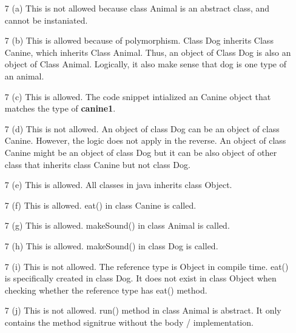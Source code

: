 \documentclass{article}
\begin{document}
\begin{enumerate}
\item[7 (a)] This is not allowed because class Animal is an abstract class, and cannot be instaniated.
\item[7 (b)] This is allowed because of polymorphism. Class Dog inherits Class Canine, which inherits Class Animal. Thus, an object of Class Dog is also an object of Class Animal. Logically, it also make sense that dog is one type of an animal.
\item[7 (c)] This is allowed. The code snippet intialized an Canine object that matches the type of \textbf{canine1}.
\item[7 (d)] This is not allowed. An object of class Dog can be an object of class Canine. However, the logic does not apply in the reverse. An object of class Canine might be an object of class Dog but it can be also object of other class that inherits class Canine but not class Dog.
\item[7 (e)] This is allowed. All classes in java inherits class Object.
\item[7 (f)] This is allowed. eat() in class Canine is called.
\item[7 (g)] This is allowed. makeSound() in class Animal is called.
\item[7 (h)] This is allowed. makeSound() in class Dog is called.
\item[7 (i)] This is not allowed. The reference type is Object in compile time. eat() is specifically created in class Dog. It does not exist in class Object when checking whether the reference type has eat() method.
\item[7 (j)] This is not allowed. run() method in class Animal is abstract. It only contains the method signitrue without the body / implementation.
\end{enumerate}
\end{document}
